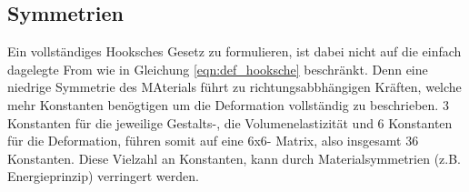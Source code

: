 \subsection{Symmetrien}
Ein vollständiges Hooksches Gesetz zu formulieren, ist dabei nicht auf die einfach dagelegte From wie 
in Gleichung \eqref{eqn:def_hooksche} beschränkt.
Denn eine niedrige Symmetrie des MAterials führt zu richtungsabbhängigen Kräften, welche mehr Konstanten
benögtigen um die Deformation vollständig zu beschrieben.
3 Konstanten für die jeweilige Gestalts-, die Volumenelastizität und 6 Konstanten für die Deformation,
führen somit auf eine 6x6- Matrix, also insgesamt 36 Konstanten.\newline
Diese Vielzahl an Konstanten, kann durch Materialsymmetrien (z.\;B. Energieprinzip) verringert werden.




